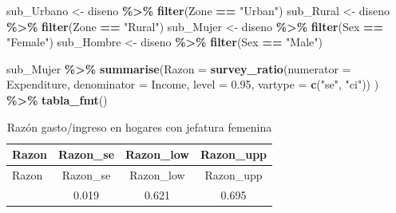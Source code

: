 \documentclass[
  spanish,
  12pt,
]{book}
\newenvironment{Shaded}{\begin{snugshade}}{\end{snugshade}}
\newcommand{\AttributeTok}[1]{\textcolor[rgb]{0.13,0.29,0.53}{#1}}
\newcommand{\FloatTok}[1]{\textcolor[rgb]{0.00,0.00,0.81}{#1}}
\newcommand{\FunctionTok}[1]{\textcolor[rgb]{0.13,0.29,0.53}{\textbf{#1}}}
\newcommand{\NormalTok}[1]{#1}
\newcommand{\OtherTok}[1]{\textcolor[rgb]{0.56,0.35,0.01}{#1}}
\newcommand{\SpecialCharTok}[1]{\textcolor[rgb]{0.81,0.36,0.00}{\textbf{#1}}}
\newcommand{\StringTok}[1]{\textcolor[rgb]{0.31,0.60,0.02}{#1}}
\begin{document}
\begin{Shaded}
\begin{Highlighting}[]
\NormalTok{sub\_Urbano }\OtherTok{\textless{}{-}}\NormalTok{ diseno }\SpecialCharTok{\%\textgreater{}\%} \FunctionTok{filter}\NormalTok{(Zone }\SpecialCharTok{==} \StringTok{"Urban"}\NormalTok{)}
\NormalTok{sub\_Rural }\OtherTok{\textless{}{-}}\NormalTok{ diseno }\SpecialCharTok{\%\textgreater{}\%} \FunctionTok{filter}\NormalTok{(Zone }\SpecialCharTok{==} \StringTok{"Rural"}\NormalTok{)}
\NormalTok{sub\_Mujer }\OtherTok{\textless{}{-}}\NormalTok{ diseno }\SpecialCharTok{\%\textgreater{}\%} \FunctionTok{filter}\NormalTok{(Sex }\SpecialCharTok{==} \StringTok{"Female"}\NormalTok{)}
\NormalTok{sub\_Hombre }\OtherTok{\textless{}{-}}\NormalTok{ diseno }\SpecialCharTok{\%\textgreater{}\%} \FunctionTok{filter}\NormalTok{(Sex }\SpecialCharTok{==} \StringTok{"Male"}\NormalTok{)}
\end{Highlighting}
\end{Shaded}

\begin{Shaded}
\begin{Highlighting}[]
\NormalTok{sub\_Mujer }\SpecialCharTok{\%\textgreater{}\%} 
  \FunctionTok{summarise}\NormalTok{(}\AttributeTok{Razon =} \FunctionTok{survey\_ratio}\NormalTok{(}\AttributeTok{numerator =}\NormalTok{ Expenditure,}
                                 \AttributeTok{denominator =}\NormalTok{ Income,}
                                 \AttributeTok{level =} \FloatTok{0.95}\NormalTok{,}
                                 \AttributeTok{vartype =}  \FunctionTok{c}\NormalTok{(}\StringTok{"se"}\NormalTok{, }\StringTok{"ci"}\NormalTok{))}
\NormalTok{            ) }\SpecialCharTok{\%\textgreater{}\%}
  \FunctionTok{tabla\_fmt}\NormalTok{()}
\end{Highlighting}
\end{Shaded}

\begin{longtable}[]{@{}lccc@{}}
\caption{\label{tab:tab-razon-gasto-ingreso-mujer}Razón gasto/ingreso en hogares con jefatura femenina}\tabularnewline
\toprule\noalign{}
Razon & Razon\_se & Razon\_low & Razon\_upp \\
\midrule\noalign{}
\endfirsthead
\toprule\noalign{}
Razon & Razon\_se & Razon\_low & Razon\_upp \\
\midrule\noalign{}
\endhead
\bottomrule\noalign{}
\endlastfoot
0.658 & 0.019 & 0.621 & 0.695 \\
\end{longtable}
\end{document}
